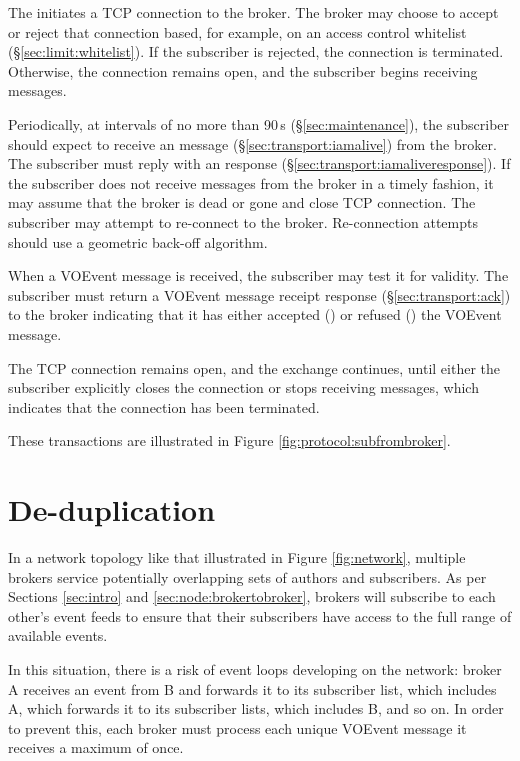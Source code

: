\documentclass[a4paper,11pt]{ivoa}
\begin{document}
The initiates a TCP connection to the broker. The broker may choose to accept
or reject that connection based, for example, on an access control whitelist
(\S\ref{sec:limit:whitelist}). If the subscriber is rejected, the connection
is terminated. Otherwise, the connection remains open, and the subscriber
begins receiving messages.

Periodically, at intervals of no more than 90\,s (\S\ref{sec:maintenance}),
the subscriber should expect to receive an   message
(\S\ref{sec:transport:iamalive}) from the broker. The subscriber must reply
with an  response (\S\ref{sec:transport:iamaliveresponse}).
If the subscriber does not receive  messages from the broker
in a timely fashion, it may assume that the broker is dead or gone and close
TCP connection. The subscriber may attempt to re-connect to the broker.
Re-connection attempts should use a geometric back-off algorithm.

When a VOEvent message is received, the subscriber may test it for
validity. The subscriber must return a VOEvent message receipt response
(\S\ref{sec:transport:ack}) to the broker indicating that it has either
accepted () or refused () the VOEvent message.

The TCP connection remains open, and the  exchange
continues, until either the subscriber explicitly closes the connection or
stops receiving  messages, which indicates that the
connection has been terminated.

These transactions are illustrated in Figure \ref{fig:protocol:subfrombroker}.

\section{De-duplication}
\label{sec:dedup}

In a network topology like that illustrated in Figure \ref{fig:network},
multiple brokers service potentially overlapping sets of authors and
subscribers. As per Sections \ref{sec:intro} and
\ref{sec:node:brokertobroker}, brokers will subscribe to each other's event
feeds to ensure that their subscribers have access to the full range of
available events.

In this situation, there is a risk of event loops developing on the network:
broker A receives an event from B and forwards it to its subscriber list,
which includes A, which forwards it to its subscriber lists, which includes B,
and so on. In order to prevent this, each broker must process each unique
VOEvent message it receives a maximum of once.
\end{document}

